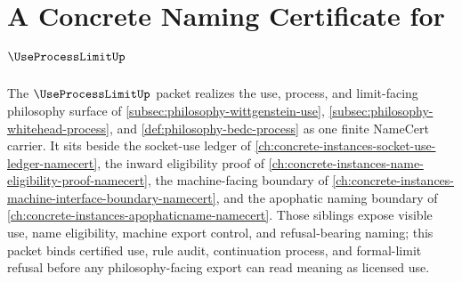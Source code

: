 \chapter{A Concrete Naming Certificate for $\UseProcessLimitUp$}
\label{ch:concrete-instances-useprocesslimit-namecert}

The $\UseProcessLimitUp$ packet realizes the use, process, and limit-facing philosophy surface of \autoref{subsec:philosophy-wittgenstein-use}, \autoref{subsec:philosophy-whitehead-process}, and \autoref{def:philosophy-bedc-process} as one finite NameCert carrier. It sits beside the socket-use ledger of \autoref{ch:concrete-instances-socket-use-ledger-namecert}, the inward eligibility proof of \autoref{ch:concrete-instances-name-eligibility-proof-namecert}, the machine-facing boundary of \autoref{ch:concrete-instances-machine-interface-boundary-namecert}, and the apophatic naming boundary of \autoref{ch:concrete-instances-apophaticname-namecert}. Those siblings expose visible use, name eligibility, machine export control, and refusal-bearing naming; this packet binds certified use, rule audit, continuation process, and formal-limit refusal before any philosophy-facing export can read meaning as licensed use.

